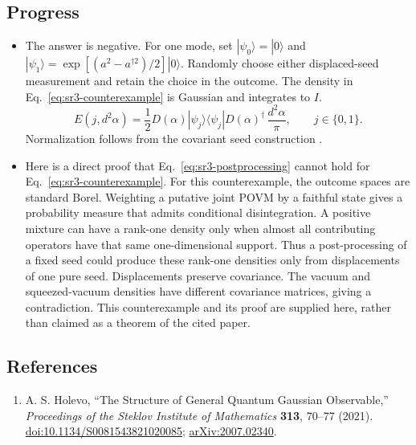 \subsection*{Progress}

\begin{itemize}
  \item The answer is negative. For one mode, set $|\psi_0\rangle=|0\rangle$ and $|\psi_1\rangle=\exp[(a^2-a^{\dagger2})/2]|0\rangle$. Randomly choose either displaced-seed measurement and retain the choice in the outcome. The density in Eq.~\eqref{eq:sr3-counterexample} is Gaussian and integrates to $I$.
\begin{equation}
E(j,d^2\alpha)=\frac12D(\alpha)|\psi_j\rangle\langle\psi_j|D(\alpha)^\dagger\,\frac{d^2\alpha}{\pi},\qquad j\in\{0,1\}.
\label{eq:sr3-counterexample}
\end{equation}
Normalization follows from the covariant seed construction .

  \item Here is a direct proof that Eq.~\eqref{eq:sr3-postprocessing} cannot hold for Eq.~\eqref{eq:sr3-counterexample}. For this counterexample, the outcome spaces are standard Borel. Weighting a putative joint POVM by a faithful state gives a probability measure that admits conditional disintegration. A positive mixture can have a rank-one density only when almost all contributing operators have that same one-dimensional support. Thus a post-processing of a fixed seed could produce these rank-one densities only from displacements of one pure seed. Displacements preserve covariance. The vacuum and squeezed-vacuum densities have different covariance matrices, giving a contradiction. This counterexample and its proof are supplied here, rather than claimed as a theorem of the cited paper.
\end{itemize}

\subsection*{References}

\begin{enumerate}[label={},leftmargin=4.8em,labelsep=0.5em]
  \footnotesize
  \item[\textup{[Hol21]}]\label{ref:sr3-holevo}
  A. S. Holevo, ``The Structure of General Quantum Gaussian Observable,'' \emph{Proceedings of the Steklov Institute of Mathematics} \textbf{313}, 70--77 (2021). \href{https://doi.org/10.1134/S0081543821020085}{doi:10.1134/S0081543821020085}; \href{https://arxiv.org/abs/2007.02340}{arXiv:2007.02340}.
\end{enumerate}

